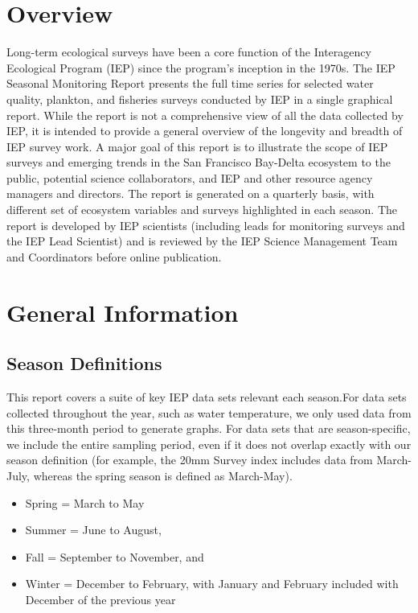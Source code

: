 \documentclass[
]{book}
\providecommand{\tightlist}{%
  \setlength{\itemsep}{0pt}\setlength{\parskip}{0pt}}
\begin{document}
\hypertarget{overview}{%
\section{Overview}\label{overview}}

Long-term ecological surveys have been a core function of the Interagency Ecological Program (IEP) since the program's inception in the 1970s. The IEP Seasonal Monitoring Report presents the full time series for selected water quality, plankton, and fisheries surveys conducted by IEP in a single graphical report. While the report is not a comprehensive view of all the data collected by IEP, it is intended to provide a general overview of the longevity and breadth of IEP survey work. A major goal of this report is to illustrate the scope of IEP surveys and emerging trends in the San Francisco Bay-Delta ecosystem to the public, potential science collaborators, and IEP and other resource agency managers and directors. The report is generated on a quarterly basis, with different set of ecosystem variables and surveys highlighted in each season. The report is developed by IEP scientists (including leads for monitoring surveys and the IEP Lead Scientist) and is reviewed by the IEP Science Management Team and Coordinators before online publication.

\hypertarget{general-information}{%
\section{General Information}\label{general-information}}

\hypertarget{season-definitions}{%
\subsection{Season Definitions}\label{season-definitions}}

This report covers a suite of key IEP data sets relevant each season.For data sets collected throughout the year, such as water temperature, we only used data from this three-month period to generate graphs. For data sets that are season-specific, we include the entire sampling period, even if it does not overlap exactly with our season definition (for example, the 20mm Survey index includes data from March-July, whereas the spring season is defined as March-May).

\begin{itemize}
\tightlist
\item
  Spring = March to May
\item
  Summer = June to August,
\item
  Fall = September to November, and\\
\item
  Winter = December to February, with January and February included with December of the previous year
\end{itemize}
\end{document}
